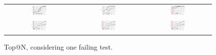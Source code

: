 \documentclass[sigplan,10pt,review,anonymous]{acmart}\settopmatter{printfolios=true,printccs=false,printacmref=false}
\begin{document}
\begin{figure}[!ht]
\begin{tabular}{cl|rrrrrrrrrr}
      \multicolumn{2}{c}{\includegraphics[width=0.25\textwidth]{R/commons-lang-onefailingtest-filtering.pdf}}
      &
      \multicolumn{5}{c}{\includegraphics[width=0.25\textwidth]{R/jfreechart-onefailingtest-filtering.pdf}}
      &
      \multicolumn{5}{c}{\includegraphics[width=0.25\textwidth]{R/jodatime-onefailingtest-filtering.pdf}}\\

      \multicolumn{2}{c}{\includegraphics[width=0.25\textwidth]{R/mockito-onefailingtest-filtering.pdf}}
      &
      \multicolumn{5}{c}{\includegraphics[width=0.25\textwidth]{R/mockito-onefailingtest-filtering.pdf}}
      &
      \multicolumn{5}{c}{\includegraphics[width=0.25\textwidth]{R/mockito-onefailingtest-filtering.pdf}}\\

      \bottomrule

    \end{tabular}
    \caption{\label{fig:one-failing-test}Top@N, considering one failing test.}
\end{figure}
\end{document}
